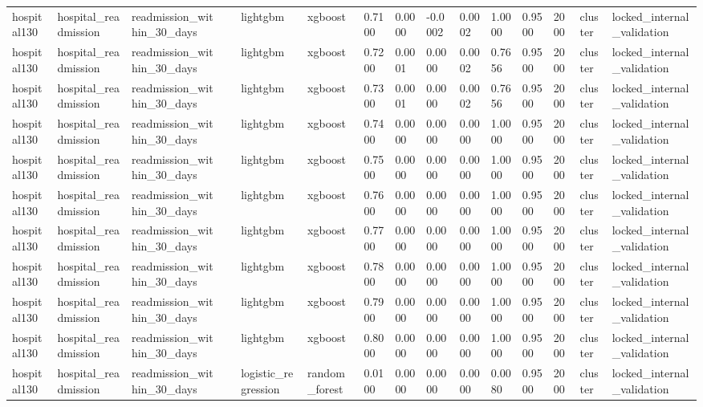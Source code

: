 \begin{tabular}{lllllllllllllll}
hospital130 & hospital\_readmission & readmission\_within\_30\_days &  & lightgbm & xgboost & 0.7100 & 0.0000 & -0.0002 & 0.0002 & 1.0000 & 0.9500 & 2000 & cluster & locked\_internal\_validation \\
hospital130 & hospital\_readmission & readmission\_within\_30\_days &  & lightgbm & xgboost & 0.7200 & 0.0001 & 0.0000 & 0.0002 & 0.7656 & 0.9500 & 2000 & cluster & locked\_internal\_validation \\
hospital130 & hospital\_readmission & readmission\_within\_30\_days &  & lightgbm & xgboost & 0.7300 & 0.0001 & 0.0000 & 0.0002 & 0.7656 & 0.9500 & 2000 & cluster & locked\_internal\_validation \\
hospital130 & hospital\_readmission & readmission\_within\_30\_days &  & lightgbm & xgboost & 0.7400 & 0.0000 & 0.0000 & 0.0000 & 1.0000 & 0.9500 & 2000 & cluster & locked\_internal\_validation \\
hospital130 & hospital\_readmission & readmission\_within\_30\_days &  & lightgbm & xgboost & 0.7500 & 0.0000 & 0.0000 & 0.0000 & 1.0000 & 0.9500 & 2000 & cluster & locked\_internal\_validation \\
hospital130 & hospital\_readmission & readmission\_within\_30\_days &  & lightgbm & xgboost & 0.7600 & 0.0000 & 0.0000 & 0.0000 & 1.0000 & 0.9500 & 2000 & cluster & locked\_internal\_validation \\
hospital130 & hospital\_readmission & readmission\_within\_30\_days &  & lightgbm & xgboost & 0.7700 & 0.0000 & 0.0000 & 0.0000 & 1.0000 & 0.9500 & 2000 & cluster & locked\_internal\_validation \\
hospital130 & hospital\_readmission & readmission\_within\_30\_days &  & lightgbm & xgboost & 0.7800 & 0.0000 & 0.0000 & 0.0000 & 1.0000 & 0.9500 & 2000 & cluster & locked\_internal\_validation \\
hospital130 & hospital\_readmission & readmission\_within\_30\_days &  & lightgbm & xgboost & 0.7900 & 0.0000 & 0.0000 & 0.0000 & 1.0000 & 0.9500 & 2000 & cluster & locked\_internal\_validation \\
hospital130 & hospital\_readmission & readmission\_within\_30\_days &  & lightgbm & xgboost & 0.8000 & 0.0000 & 0.0000 & 0.0000 & 1.0000 & 0.9500 & 2000 & cluster & locked\_internal\_validation \\
hospital130 & hospital\_readmission & readmission\_within\_30\_days &  & logistic\_regression & random\_forest & 0.0100 & 0.0000 & 0.0000 & 0.0000 & 0.0080 & 0.9500 & 2000 & cluster & locked\_internal\_validation \\

\end{tabular}

